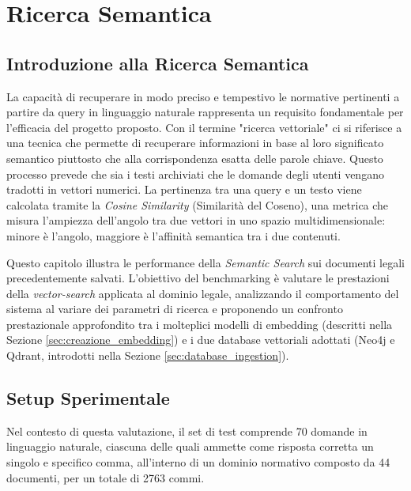 \chapter{Ricerca Semantica}\label{chap:semantic-search}

\inlineminitoc

\section{Introduzione alla Ricerca Semantica}
La capacità di recuperare in modo preciso e tempestivo le normative pertinenti a partire da query in linguaggio naturale rappresenta un requisito fondamentale per l'efficacia del progetto proposto. Con il termine "ricerca vettoriale" ci si riferisce a una tecnica che permette di recuperare informazioni in base al loro significato semantico piuttosto che alla corrispondenza esatta delle parole chiave. Questo processo prevede che sia i testi archiviati che le domande degli utenti vengano tradotti in vettori numerici. La pertinenza tra una query e un testo viene calcolata tramite la \textit{Cosine Similarity} (Similarità del Coseno), una metrica che misura l'ampiezza dell'angolo tra due vettori in uno spazio multidimensionale: minore è l'angolo, maggiore è l'affinità semantica tra i due contenuti.

Questo capitolo illustra le performance della \textit{Semantic Search} sui documenti legali precedentemente salvati. L'obiettivo del benchmarking è valutare le prestazioni della \textit{vector-search} applicata al dominio legale, analizzando il comportamento del sistema al variare dei parametri di ricerca e proponendo un confronto prestazionale approfondito tra i molteplici modelli di embedding (descritti nella Sezione \ref{sec:creazione_embedding}) e i due database vettoriali adottati (Neo4j e Qdrant, introdotti nella Sezione \ref{sec:database_ingestion}).

\section{Setup Sperimentale}
Nel contesto di questa valutazione, il set di test comprende 70 domande in linguaggio naturale, ciascuna delle quali ammette come risposta corretta un singolo e specifico comma, all'interno di un dominio normativo composto da 44 documenti, per un totale di 2763 commi.

